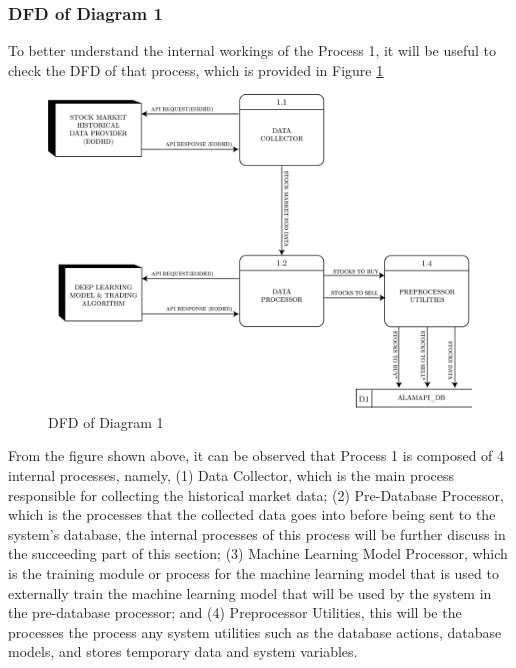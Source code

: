 \subsubsection{DFD of Diagram 1}
\label{subsubsec:dfd1}
To better understand the internal workings of the 
Process 1, it will be useful to check the DFD of that process, 
which is provided in Figure \ref{fig:dfd1}
\begin{figure}[ht]
    \centering
    \includegraphics[width=1\textwidth]{./assets/Chapter_3/DFD/DFD_1.png}
    \caption{DFD of Diagram 1}
    \label{fig:dfd1}
\end{figure}
\FloatBarrier

From the figure shown above, it can be observed that Process 1 
is composed of 4 internal processes, namely, 
(1) Data Collector, which is the main process responsible 
for collecting the historical market data; 
(2) Pre-Database Processor, which is the processes that the collected 
data goes into before being sent to the system’s database, the 
internal processes of this process will be further discuss in the 
succeeding part of this section; 
(3) Machine Learning Model Processor, which is the training module or 
process for the machine learning model that is used to externally train 
the machine learning model that will be used by the system in the 
pre-database processor; and 
(4) Preprocessor Utilities, this will be the processes the process any 
system utilities such as the database actions, database models, and 
stores temporary data and system variables.

